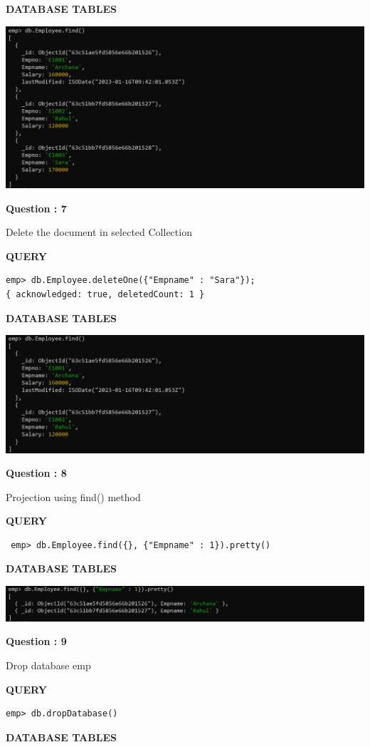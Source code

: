\documentclass[a4paper,12pt]{report}
\begin{document}
\begin{flushleft}
\textbf{DATABASE TABLES}
\end{flushleft}
\includegraphics[scale=0.4]{M6.png}
\begin{flushleft}
    \textbf{Question : 7}
\end{flushleft}
Delete the document in selected Collection
\begin{flushleft}
\textbf{QUERY }
\end{flushleft}
 \begin{verbatim}
emp> db.Employee.deleteOne({"Empname" : "Sara"});
{ acknowledged: true, deletedCount: 1 }
\end{verbatim}
\begin{flushleft}
\textbf{DATABASE TABLES}
\end{flushleft}
\includegraphics[scale=0.4]{M8.png}
\begin{flushleft}
    \textbf{Question : 8}
\end{flushleft}
Projection using find() method
\begin{flushleft}
\textbf{QUERY }
\end{flushleft}
 \begin{verbatim}
 emp> db.Employee.find({}, {"Empname" : 1}).pretty()
\end{verbatim}
\begin{flushleft}
\textbf{DATABASE TABLES}
\end{flushleft}
\includegraphics[scale=0.386]{M9copy.png}
\begin{flushleft}
    \textbf{Question : 9}
\end{flushleft}
Drop database emp
\begin{flushleft}
\textbf{QUERY }
\end{flushleft}
 \begin{verbatim}
emp> db.dropDatabase()
\end{verbatim}
\begin{flushleft}
\textbf{DATABASE TABLES}
\end{flushleft}
\end{document}
